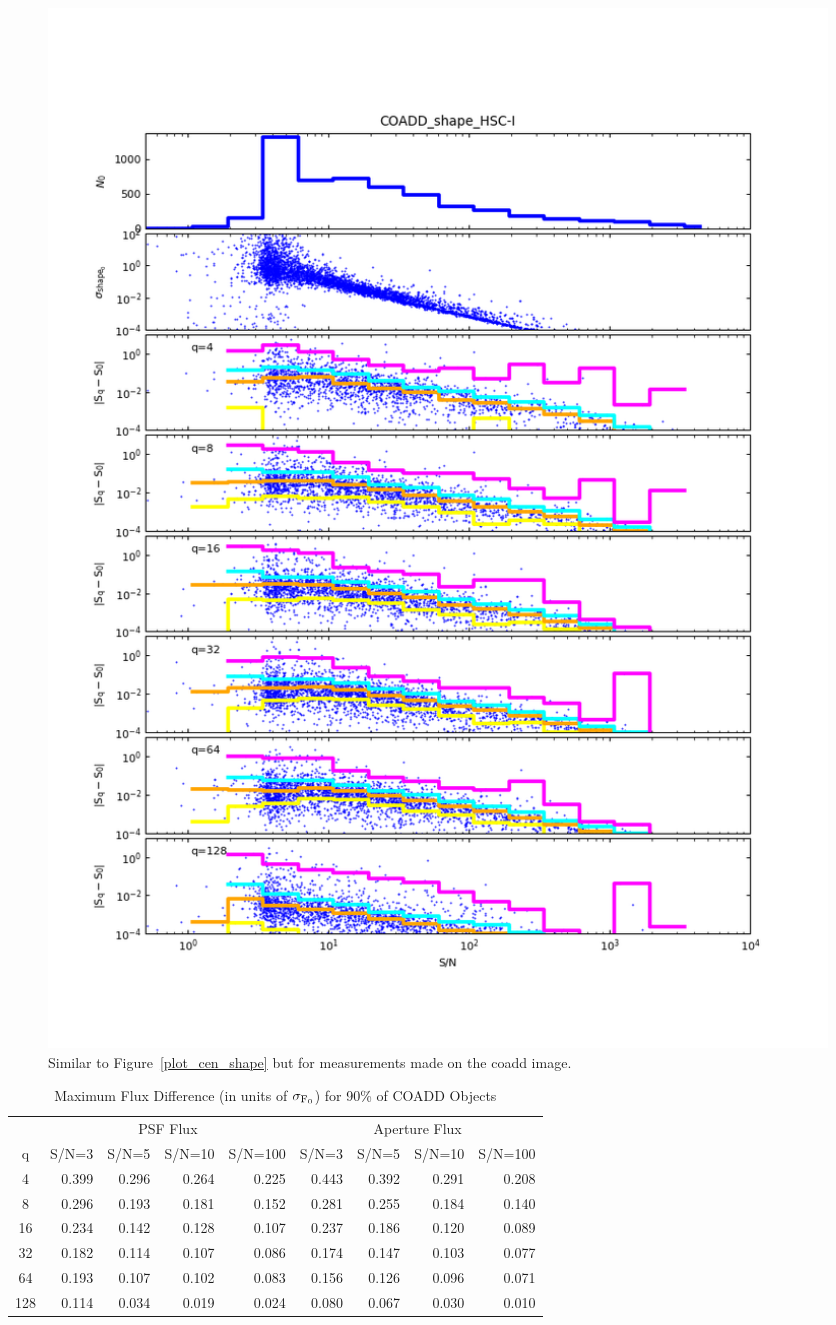 \begin{figure}[t]
\begin{minipage}{.49\textwidth}
        \includegraphics[width=1.0\textwidth]{figure/plot_coadd_shape_HSC-I.png}
    \end{minipage}
\caption{Similar to Figure~\ref{plot_cen_shape} but for measurements made on the coadd image.}
\label{plot_coadd_cen_shape}
\end{figure}


\begin{table}[ht]
\caption{Maximum Flux Difference (in units of $\sigma_{\rm F_0}$) for 90\% of COADD Objects}
\centering
\begin{tabular}[]{c|rrrr|rrrr}
\hline
     &  \multicolumn{4}{c}{PSF Flux}  & \multicolumn{4}{c}{Aperture Flux} \\
 q   &  S/N=3 & S/N=5 & S/N=10 & S/N=100 & S/N=3 & S/N=5 & S/N=10 & S/N=100  \\
\hline
   4 & 0.399 & 0.296 & 0.264 &  0.225   &  0.443 & 0.392 & 0.291 &  0.208 \\
   8 & 0.296 & 0.193 & 0.181 &  0.152   &  0.281 & 0.255 & 0.184 &  0.140 \\
  16 & 0.234 & 0.142 & 0.128 &  0.107   &  0.237 & 0.186 & 0.120 &  0.089 \\
  32 & 0.182 & 0.114 & 0.107 &  0.086   &  0.174 & 0.147 & 0.103 &  0.077 \\
  64 & 0.193 & 0.107 & 0.102 &  0.083   &  0.156 & 0.126 & 0.096 &  0.071 \\
 128 & 0.114 & 0.034 & 0.019 &  0.024   &  0.080 & 0.067 & 0.030 &  0.010 \\
\hline
\end{tabular}
\label{tab_coadd_flux_diff}
\end{table}


